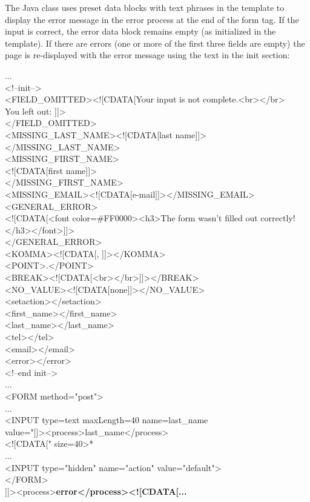 The Java class uses preset data blocks with text phrases in the template
to display the error message in the error process at the end of the form
tag. If the input is correct, the error data block remains empty (as
initialized in the template). If there are errors (one or more of the
first three fields are empty) the page is re-displayed with the error
message using the text in the {\name init} section:
\begin{java}
...\\
<!--init-->\\
<FIELD\_OMITTED><![CDATA[Your input is not complete.<br></br>\\
You left out: ]]>\\
</FIELD\_OMITTED>\\
<MISSING\_LAST\_NAME><![CDATA[last name]]></MISSING\_LAST\_NAME>\\
<MISSING\_FIRST\_NAME>\\
<![CDATA[first name]]>\\
</MISSING\_FIRST\_NAME>\\
<MISSING\_EMAIL><![CDATA[e-mail]]></MISSING\_EMAIL>\\
<GENERAL\_ERROR>\\
<![CDATA[<font color=\#FF0000><h3>The form wasn't filled out correctly!\\
</h3></font>]]>\\
</GENERAL\_ERROR>\\

<KOMMA><![CDATA[, ]]></KOMMA>\\
<POINT>.</POINT>\\
<BREAK><![CDATA[<br></br>]]></BREAK>\\
<NO\_VALUE><![CDATA[none]]></NO\_VALUE>\\

<setaction></setaction>\\
<first\_name></first\_name>\\
<last\_name></last\_name>\\
<tel></tel>\\
<email></email>\\
<error></error>\\
<!--end init-->\\
...\\
<FORM method="post">\\
...\\
<INPUT type=text maxLength=40 name=last\_name\\
value="]]><process>last\_name</process>\\
<![CDATA[" size=40>*\\
...\\
<INPUT type="hidden" name="action" value="default">\\
</FORM>\\
]]><process>\bf{error}</process><![CDATA[...\\
\end{java}


